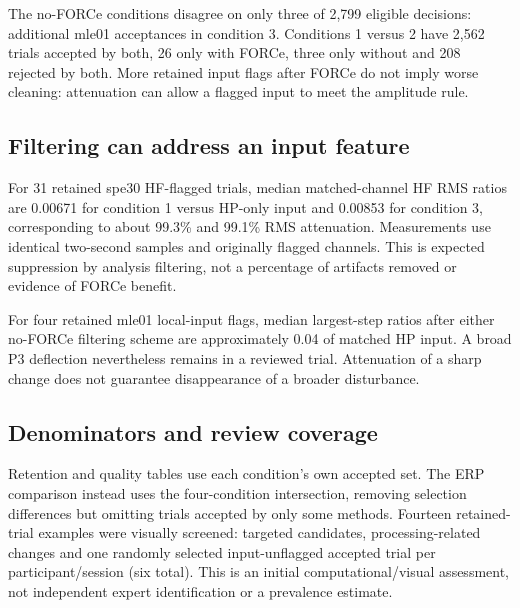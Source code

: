 \documentclass[11pt,a4paper]{article}
\begin{document}
The no-FORCe conditions disagree on only three of 2,799 eligible decisions: additional mle01 acceptances in condition 3. Conditions 1 versus 2 have 2,562 trials accepted by both, 26 only with FORCe, three only without and 208 rejected by both. More retained input flags after FORCe do not imply worse cleaning: attenuation can allow a flagged input to meet the amplitude rule.
\subsection{Filtering can address an input feature}
For 31 retained spe30 HF-flagged trials, median matched-channel HF RMS ratios are 0.00671 for condition 1 versus HP-only input and 0.00853 for condition 3, corresponding to about 99.3\% and 99.1\% RMS attenuation. Measurements use identical two-second samples and originally flagged channels. This is expected suppression by analysis filtering, not a percentage of artifacts removed or evidence of FORCe benefit.

For four retained mle01 local-input flags, median largest-step ratios after either no-FORCe filtering scheme are approximately 0.04 of matched HP input. A broad P3 deflection nevertheless remains in a reviewed trial. Attenuation of a sharp change does not guarantee disappearance of a broader disturbance.
\subsection{Denominators and review coverage}
Retention and quality tables use each condition's own accepted set. The ERP comparison instead uses the four-condition intersection, removing selection differences but omitting trials accepted by only some methods. Fourteen retained-trial examples were visually screened: targeted candidates, processing-related changes and one randomly selected input-unflagged accepted trial per participant/session (six total). This is an initial computational/visual assessment, not independent expert identification or a prevalence estimate.
\clearpage
\end{document}
